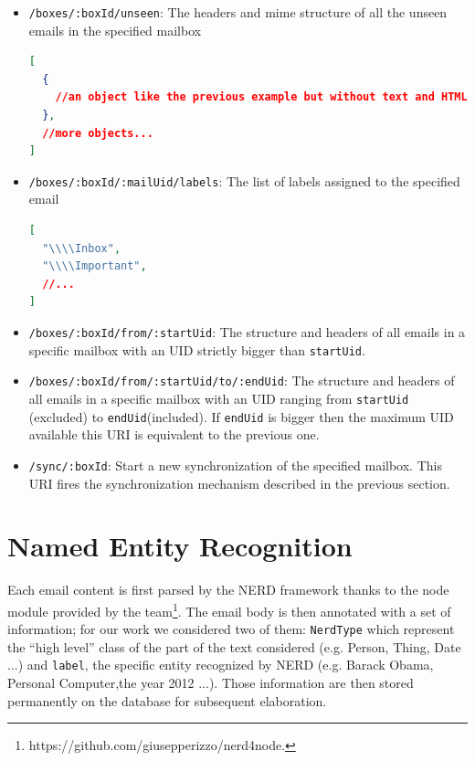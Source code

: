 \documentclass[a4paper,12pt]{report}
\begin{document}
\begin{itemize}
\begin{lstlisting}[language=JSON]
  ]
}
\end{lstlisting}
\item \texttt{/boxes/:boxId/unseen}: The headers and mime structure of  all the unseen emails in the specified mailbox
\begin{lstlisting}[language=JSON]
[
  {
    //an object like the previous example but without text and HTML 
  },
  //more objects...
]
\end{lstlisting}
\item \texttt{/boxes/:boxId/:mailUid/labels}: The list of labels assigned to the specified email
\begin{lstlisting}[language=JSON]
[
  "\\\\Inbox",
  "\\\\Important",
  //...
]
\end{lstlisting}
\item \texttt{/boxes/:boxId/from/:startUid}: The structure and headers of all emails in a specific mailbox with an UID strictly bigger than \texttt{startUid}.
\item \texttt{/boxes/:boxId/from/:startUid/to/:endUid}: The structure and headers of all emails in a specific mailbox with an UID ranging from \texttt{startUid} (excluded) to \texttt{endUid}(included). If \texttt{endUid} is bigger then the maximum UID available this URI is equivalent to the previous one.
\item \texttt{/sync/:boxId}: Start a new synchronization of the specified mailbox. This URI fires the synchronization mechanism described in the previous section.
\end{itemize}

\section{Named Entity Recognition}
Each email content is first parsed by the NERD framework thanks to the node module provided by the team\footnote{https://github.com/giusepperizzo/nerd4node.}. The email body is then annotated with a set of information; for our work we considered two of them: \texttt{NerdType} which represent the ``high level'' class of the part of the text considered (e.g. Person, Thing, Date ...) and \texttt{label}, the specific entity recognized by NERD (e.g. Barack Obama, Personal Computer,the year 2012 ...). 
Those information are then stored permanently on the database for subsequent elaboration.
\end{document}
